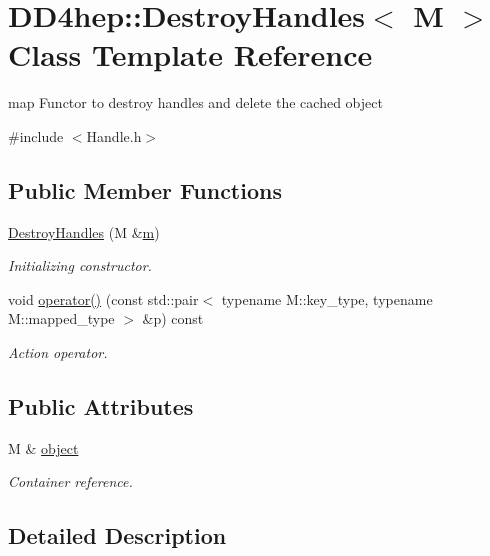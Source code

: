 \hypertarget{class_d_d4hep_1_1_destroy_handles}{}\section{D\+D4hep\+:\+:Destroy\+Handles$<$ M $>$ Class Template Reference}
\label{class_d_d4hep_1_1_destroy_handles}


map Functor to destroy handles and delete the cached object  




{\ttfamily \#include $<$Handle.\+h$>$}

\subsection*{Public Member Functions}
\begin{DoxyCompactItemize}
\item 
\hyperlink{class_d_d4hep_1_1_destroy_handles_a6ea33093d41f7687b16b6cdff8d265f3}{Destroy\+Handles} (M \&\hyperlink{_volumes_8cpp_a6fc379aaec47ce424b00d8ffda2a6c59}{m})
\begin{DoxyCompactList}\small\item\em Initializing constructor. \end{DoxyCompactList}\item 
void \hyperlink{class_d_d4hep_1_1_destroy_handles_af4b98788f3d66394f5930c97eebe92e5}{operator()} (const std\+::pair$<$ typename M\+::key\+\_\+type, typename M\+::mapped\+\_\+type $>$ \&p) const
\begin{DoxyCompactList}\small\item\em Action operator. \end{DoxyCompactList}\end{DoxyCompactItemize}
\subsection*{Public Attributes}
\begin{DoxyCompactItemize}
\item 
M \& \hyperlink{class_d_d4hep_1_1_destroy_handles_a4398c11430a5bb66b962d45133e2d5f1}{object}
\begin{DoxyCompactList}\small\item\em Container reference. \end{DoxyCompactList}\end{DoxyCompactItemize}


\subsection{Detailed Description}
